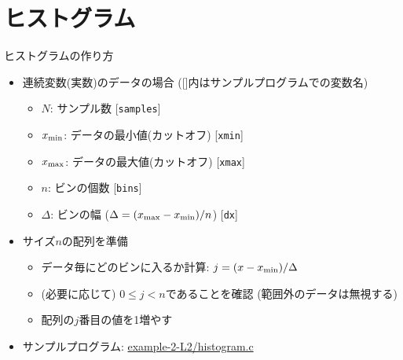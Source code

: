 \section{ヒストグラム}

\begin{frame}[t,fragile]{ヒストグラムの作り方}
  \begin{itemize}
    \setlength{\itemsep}{1em}
  \item 連続変数(実数)のデータの場合 ([]内はサンプルプログラムでの変数名)
    \begin{itemize}
    \item $N$: サンプル数 [{\tt samples}]
    \item $x_{\rm min}$: データの最小値(カットオフ) [{\tt xmin}]
    \item $x_{\rm max}$: データの最大値(カットオフ) [{\tt xmax}]
    \item $n$: ビンの個数 [{\tt bins}]
    \item $\Delta$: ビンの幅 ($\Delta=(x_{\rm max}-x_{\rm min}) / n$) [{\tt dx}]
    \end{itemize}
  \item サイズ$n$の配列を準備
    \begin{itemize}
    \item データ毎にどのビンに入るか計算: $j = (x - x_{\rm min}) / \Delta$
    \item (必要に応じて) $0 \le j < n$であることを確認 (範囲外のデータは無視する)
    \item 配列の$j$番目の値を1増やす
    \end{itemize}
    \item サンプルプログラム: \href{https://github.com/todo-group/computer-experiments/blob/master/exercise/monte_carlo/histogram.c}{example-2-L2/histogram.c}
  \end{itemize}
\end{frame}

